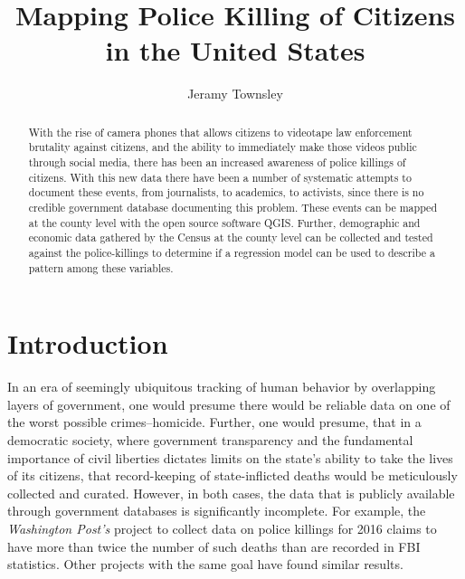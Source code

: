 \documentclass[sigconf]{acmart}
\begin{document}
\title{Mapping Police Killing of Citizens in the United States}

\author{Jeramy Townsley}


\begin{abstract}
With the rise of camera phones that allows citizens to videotape law enforcement brutality against citizens, and the ability to immediately make those videos public through social media, there has been an increased awareness of police killings of citizens.  With this new data there have been a number of systematic attempts to document these events, from journalists, to academics, to activists, since there is no credible government database documenting this problem. These events can be mapped at the county level with the open source software QGIS.  Further, demographic and economic data gathered by the Census at the county level can be collected and tested against the police-killings to determine if a regression model can be used to describe a pattern among these variables. 
\end{abstract}


\maketitle

\section{Introduction}

In an era of seemingly ubiquitous tracking of human behavior by  overlapping layers of government, one would presume there would be reliable data on one of the worst possible crimes--homicide. Further, one would presume, that in a democratic society, where government transparency and the fundamental importance of civil liberties dictates limits on the state's ability to take the lives of its citizens, that record-keeping of state-inflicted deaths would be meticulously collected and curated. \cite{brucato15} However, in both cases, the data that is publicly available through government databases is significantly incomplete.  \cite{currie16, pridemore05,dalton17,nix17} For example, the {\em Washington Post's} project to collect data on police killings for 2016 claims to have more than twice the number of such deaths than are recorded in FBI statistics. \cite{fatalforce}  Other projects with the same goal have found similar results. \cite{policeviolence,counted} 
\end{document}
